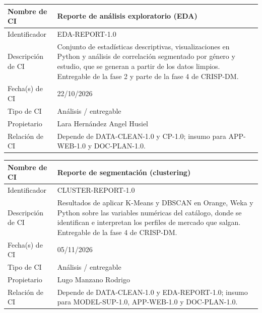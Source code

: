 \documentclass[letterpaper,11pt]{article}
\begin{document}
\noindent\begin{minipage}{\textwidth}
\small\renewcommand{\arraystretch}{1.9}
\begin{tabularx}{\textwidth}{|p{3.3cm}|Y|}
\hline
Nombre de CI & Reporte de análisis exploratorio (EDA) \\ \hline
Identificador & EDA-REPORT-1.0 \\ \hline
Descripción de CI & Conjunto de estadísticas descriptivas, visualizaciones en Python y análisis de correlación segmentado por género y estudio, que se generan a partir de los datos limpios. Entregable de la fase 2 y parte de la fase 4 de CRISP-DM. \\ \hline
Fecha(s) de CI & 22/10/2026 \\ \hline
Tipo de CI & Análisis / entregable \\ \hline
Propietario & Lara Hernández Angel Husiel \\ \hline
Relación de CI & Depende de DATA-CLEAN-1.0 y CP-1.0; insumo para APP-WEB-1.0 y DOC-PLAN-1.0. \\ \hline
\end{tabularx}
\end{minipage}\par\bigskip
\noindent\begin{minipage}{\textwidth}
\small\renewcommand{\arraystretch}{1.9}
\begin{tabularx}{\textwidth}{|p{3.3cm}|Y|}
\hline
Nombre de CI & Reporte de segmentación (clustering) \\ \hline
Identificador & CLUSTER-REPORT-1.0 \\ \hline
Descripción de CI & Resultados de aplicar K-Means y DBSCAN en Orange, Weka y Python sobre las variables numéricas del catálogo, donde se identifican e interpretan los perfiles de mercado que salgan. Entregable de la fase 4 de CRISP-DM. \\ \hline
Fecha(s) de CI & 05/11/2026 \\ \hline
Tipo de CI & Análisis / entregable \\ \hline
Propietario & Lugo Manzano Rodrigo \\ \hline
Relación de CI & Depende de DATA-CLEAN-1.0 y EDA-REPORT-1.0; insumo para MODEL-SUP-1.0, APP-WEB-1.0 y DOC-PLAN-1.0. \\ \hline
\end{tabularx}
\end{minipage}\par\bigskip
\end{document}

